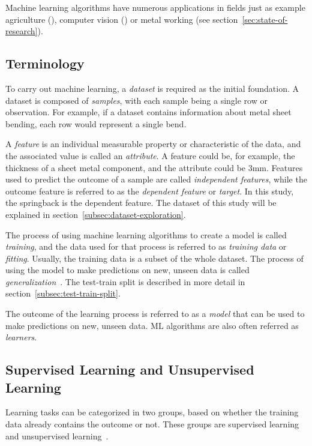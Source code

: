 Machine learning algorithms have numerous applications in fields just as example agriculture (\cite{
    yoosefzadeh2021application}), computer vision (\cite{hu2020voronoi}) or metal working
(see section~\ref{sec:state-of-research}).

\subsection{Terminology}\label{subsec:terminology}
To carry out machine learning, a \textit{dataset} is required as the initial foundation.
A dataset is composed of \textit{samples}, with each sample being a single row or observation.
For example, if a dataset contains information about metal sheet bending, each row would represent a single bend.

A \textit{feature} is an individual measurable property or characteristic of the data, and the associated value is
called
an \textit{attribute}.
A feature could be, for example, the thickness of a sheet metal component, and the attribute could be 3mm.
Features used to predict the outcome of a sample are called \textit{independent features}, while the outcome feature is
referred to as the \textit{dependent feature} or \textit{target}. In this study, the springback is the dependent
feature.
The dataset of this study will be explained in section~\ref{subsec:dataset-exploration}.

The process of using machine learning algorithms to create a model is called \textit{training}, and the data used for
that process is referred to as \textit{training data} or \textit{fitting}.
Usually, the training data is a subset of the whole dataset.
The process of using the model to make predictions on new, unseen data is called
\textit{generalization}~\cite[p. 35]{muller_introductionmachinelearning_2016}.
The test-train split is described in more detail in section~\ref{subsec:test-train-split}.

The outcome of the learning process is referred to as a \textit{model} that can be used to make predictions on new,
unseen data.
\ac{ML} algorithms are also often referred as \textit{learners}.

\subsection{Supervised Learning and Unsupervised Learning}\label{subsec:supervised-learning}
Learning tasks can be categorized in two groups, based on whether the training data already contains the outcome or not.
These groups are supervised learning and unsupervised learning~\cite[p. 4]{zhou_machinelearning_2021}.

